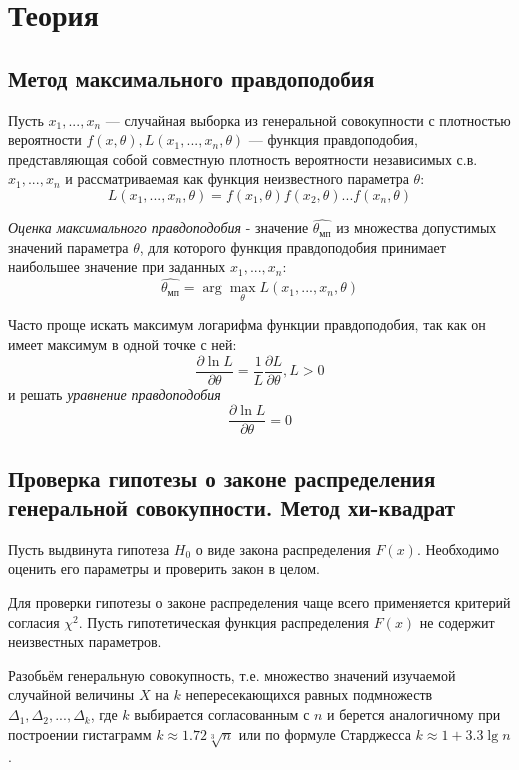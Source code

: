\documentclass[12pt,a4paper]{article}
\begin{document}
\section{Теория}
\subsection{Метод максимального правдоподобия}
Пусть $x_1,...,x_n$ — случайная выборка из генеральной совокупности с плотностью вероятности $f(x,\theta), L(x_1,...,x_n,\theta)$ — функция правдоподобия, представляющая собой совместную плотность вероятности независимых с.в. $x_1,...,x_n$ и рассматриваемая как функция неизвестного параметра $\theta$:
\begin{equation}
    L(x_1,...,x_n,\theta)=f(x_1,\theta)f(x_2,\theta)...f(x_n,\theta)
\end{equation}

\textit{Оценка максимального правдоподобия} - значение $\hat{\theta_{мп}}$ из множества допустимых значений параметра $\theta$, для которого функция правдоподобия принимает наибольшее значение при заданных $x_1,...,x_n$:
\begin{equation}
    \hat{\theta_{мп}}=\arg \max_\theta L(x_1,...,x_n,\theta)
\end{equation}

Часто проще искать максимум логарифма функции правдоподобия, так как он имеет максимум в одной точке с ней:
\begin{equation}
    \frac{\partial\ln{L}}{\partial\theta}=\frac{1}{L}\frac{\partial{L}}{\partial\theta},L>0
\end{equation}
и решать \textit{уравнение правдоподобия}
\begin{equation}
    \frac{\partial\ln{L}}{\partial\theta}=0
\end{equation}

\subsection{Проверка гипотезы о законе распределения генеральной совокупности. Метод хи-квадрат}
Пусть выдвинута гипотеза $H_0$ о виде закона распределения $F(x)$. Необходимо оценить его параметры и проверить закон в целом.

Для проверки гипотезы о законе распределения чаще всего применяется критерий согласия $\chi^2$. Пусть гипотетическая функция распределения $F(x)$ не содержит неизвестных параметров.

Разобьём генеральную совокупность, т.е. множество значений изучаемой случайной величины $X$ на $k$ непересекающихся равных подмножеств $\Delta_1,\Delta_2,...,\Delta_k$, где $k$ выбирается согласованным с $n$ и берется аналогичному при построении гистаграмм $k\approx1.72\sqrt[3]{n}$ или по формуле Старджесса $k\approx1+3.3\lg{n}$.
\end{document}
